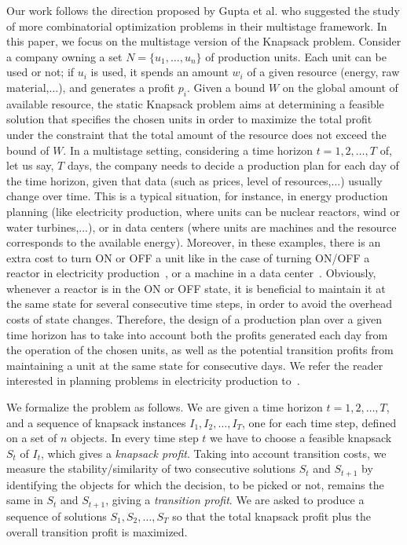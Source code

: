 \documentclass[a4paper]{book}
\begin{document}
Our work follows the direction proposed by Gupta et al. 
\cite{Gupta} who suggested the study
of more combinatorial optimization problems in their multistage framework. In this paper,
we focus on the multistage version of the {\sc Knapsack} problem. Consider a company owning
a set $N = \{u_1, \ldots , u_n\}$ of production units. Each unit can be used or not; if $u_i$ is used, it
spends an amount $w_i$ of a given resource (energy, raw material,...), and generates a profit
$p_i$. Given a bound $W$ on the global amount of available resource, the static {\sc Knapsack} problem
aims at determining a feasible solution that specifies the chosen units in order to maximize the total profit under the constraint that the total amount of the resource does not exceed the bound of $W$.
In a multistage setting, considering a time horizon $t = 1, 2, \ldots,T$ of, let us say, $T$ days,
the company needs to decide a production plan for each day of the time horizon, given that data
(such as prices, level of resources,...) usually change over time. This is a typical situation,
for instance, in energy production planning (like electricity production, where units can be
nuclear reactors, wind or water turbines,...), or in data centers (where units are machines and
the resource  corresponds to the available energy). 
Moreover, in these examples, there is an extra cost to turn ON or OFF
 a unit like in the case of turning ON/OFF a reactor in electricity production~\cite{thesececile}, or a machine in a data center~\cite{Albers17}. 
Obviously, whenever a reactor is
in the ON or OFF state, it is beneficial to maintain it at the same state for several consecutive time steps, in order to avoid the overhead costs of state changes. 
Therefore, the design of a production plan over a given time horizon has to take into account 
both the profits generated each
day from the operation of the chosen units, as well as the potential transition profits from
maintaining a unit at the same state for consecutive days.
We refer the reader interested in planning problems in electricity production to~\cite{thesececile}.

We formalize the problem as follows. We are 
given a time horizon $t=1,2,\ldots,T$, and a sequence of knapsack instances $I_1,I_2,\ldots,I_T$, one for each time step, defined on a set of $n$ objects. In every time step $t$ we have to choose a feasible knapsack $S_t$ of $I_t$, which gives a \emph{knapsack profit}. Taking into account transition costs, we measure the stability/similarity of two  consecutive solutions  $S_t$ and $S_{t+1}$ by identifying the objects for which the decision, to be picked or not, remains the same in $S_t$ and $S_{t+1}$, giving a \emph{transition profit}. We are asked to produce a sequence of solutions $S_1,S_2,\ldots,S_T$  so that the total knapsack profit plus the overall transition profit is maximized.
\end{document}

